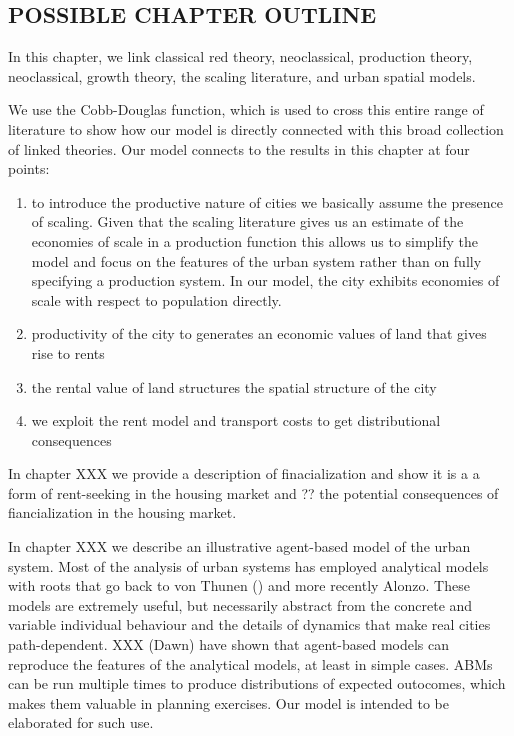 \subsection{POSSIBLE CHAPTER OUTLINE}
In this chapter, we link classical red theory, neoclassical, production theory, neoclassical, growth theory, the scaling literature,  and urban spatial models. 

We use the Cobb-Douglas function, which is used to cross this entire range of literature to show how our  model is directly connected with this broad collection of linked theories. Our model connects to the results in this chapter at four points:
\begin{enumerate}
    \item to introduce  the productive nature of cities we basically assume the presence of scaling. Given  that the scaling literature gives us an estimate of the economies of scale in a production function this allows us to simplify the model and focus on the features of the urban system rather than on fully specifying a production system. In our model, the city  exhibits economies of scale with respect to population directly. 

     \item  productivity of the city to generates an economic values of land that gives rise to rents

    \item  the rental value of land structures the spatial structure of the city

    \item we exploit the rent model and transport costs to get  distributional consequences
\end{enumerate}
 
In chapter XXX we  provide a description of finacialization and show it is a a form of rent-seeking in the housing market and ?? the potential consequences of fiancialization in the housing market. 

In chapter XXX we  describe an illustrative agent-based model of the urban system. Most of the analysis of urban systems has employed analytical models with roots that go back to von Thunen () and more recently Alonzo. These models are extremely useful, but necessarily abstract from the concrete  and variable individual behaviour and  the details  of dynamics that make real cities path-dependent. XXX (Dawn) have shown that agent-based models can reproduce the features of the analytical models, at least in simple cases. ABMs can be run multiple times to produce distributions of expected outocomes, which makes them valuable in planning exercises.  Our model is intended to be elaborated  for such use. 

